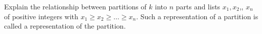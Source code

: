 \documentclass{book}
\begin{document}
\setcounter{project}{210}
\addtocounter{project}{-1}
\begin{activity}[]\label{activity-203}
\hypertarget{p-1180}{}%
Explain the relationship between partitions of \(k\) into \(n\) parts and lists \(x_1,x_2\),\textellipsis{}, \(x_n\) of positive integers with \(x_1\ge x_2\ge\ldots \ge x_n\). Such a representation of a partition is called a  representation of the partition.%
\end{activity}
\end{document}
